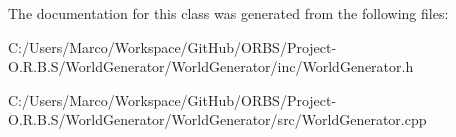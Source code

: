 The documentation for this class was generated from the following files\-:\begin{DoxyCompactItemize}
\item 
C\-:/\-Users/\-Marco/\-Workspace/\-Git\-Hub/\-O\-R\-B\-S/\-Project-\/\-O.\-R.\-B.\-S/\-World\-Generator/\-World\-Generator/inc/World\-Generator.\-h\item 
C\-:/\-Users/\-Marco/\-Workspace/\-Git\-Hub/\-O\-R\-B\-S/\-Project-\/\-O.\-R.\-B.\-S/\-World\-Generator/\-World\-Generator/src/World\-Generator.\-cpp\end{DoxyCompactItemize}
